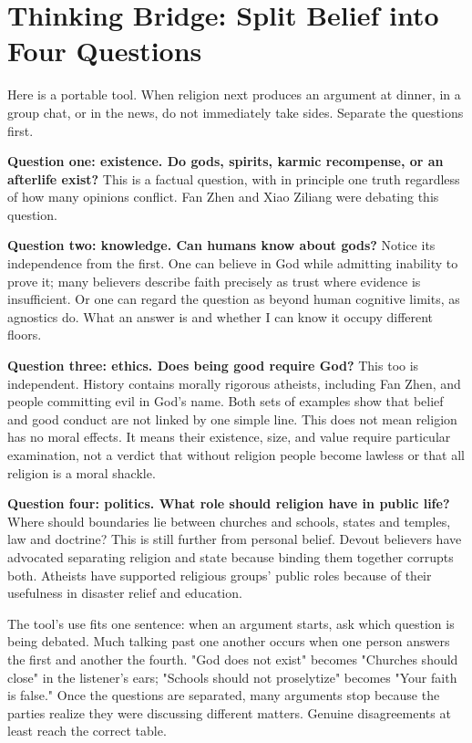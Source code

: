 \section[Thinking Bridge: Four Questions]{Thinking Bridge: Split Belief into Four Questions}
Here is a portable tool. When religion next produces an argument at dinner, in a group chat, or in the news, do not immediately take sides. Separate the questions first.

\textbf{Question one: existence. Do gods, spirits, karmic recompense, or an afterlife exist?} This is a factual question, with in principle one truth regardless of how many opinions conflict. Fan Zhen and Xiao Ziliang were debating this question.

\textbf{Question two: knowledge. Can humans know about gods?} Notice its independence from the first. One can believe in God while admitting inability to prove it; many believers describe faith precisely as trust where evidence is insufficient. Or one can regard the question as beyond human cognitive limits, as agnostics do. What an answer is and whether I can know it occupy different floors.

\textbf{Question three: ethics. Does being good require God?} This too is independent. History contains morally rigorous atheists, including Fan Zhen, and people committing evil in God's name. Both sets of examples show that belief and good conduct are not linked by one simple line. This does not mean religion has no moral effects. It means their existence, size, and value require particular examination, not a verdict that without religion people become lawless or that all religion is a moral shackle.

\textbf{Question four: politics. What role should religion have in public life?} Where should boundaries lie between churches and schools, states and temples, law and doctrine? This is still further from personal belief. Devout believers have advocated separating religion and state because binding them together corrupts both. Atheists have supported religious groups' public roles because of their usefulness in disaster relief and education.

The tool's use fits one sentence: when an argument starts, ask which question is being debated. Much talking past one another occurs when one person answers the first and another the fourth. "God does not exist" becomes "Churches should close" in the listener's ears; "Schools should not proselytize" becomes "Your faith is false." Once the questions are separated, many arguments stop because the parties realize they were discussing different matters. Genuine disagreements at least reach the correct table.

